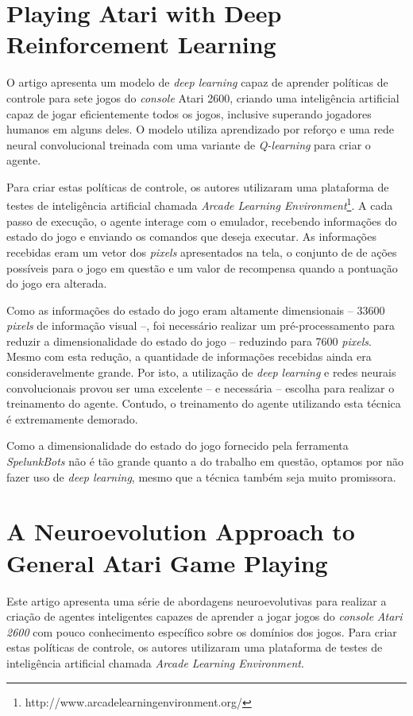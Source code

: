 \section{Playing Atari with Deep Reinforcement Learning}
O artigo apresenta um modelo de \textit{deep learning} capaz de aprender
políticas de controle para sete jogos do \textit{console} Atari 2600, criando
uma inteligência artificial capaz de jogar eficientemente todos os jogos,
inclusive superando jogadores humanos em alguns
deles\cite{DBLP:journals/corr/MnihKSGAWR13}. O modelo utiliza aprendizado por
reforço e uma rede neural convolucional treinada com uma variante de
\textit{Q-learning} para criar o agente.

Para criar estas políticas de controle, os autores utilizaram uma plataforma de
testes de inteligência artificial chamada \textit{Arcade Learning
Environment}\footnote{http://www.arcadelearningenvironment.org/}.  A cada passo
de execução, o agente interage com o emulador, recebendo informações do estado
do jogo e enviando os comandos que deseja executar. As informações recebidas
eram um vetor dos \textit{pixels} apresentados na tela, o conjunto de de ações
possíveis para o jogo em questão e um valor de recompensa quando a pontuação do
jogo era alterada.

Como as informações do estado do jogo eram altamente dimensionais -- 33600
\textit{pixels} de informação visual --, foi necessário realizar um
pré-processamento para reduzir a dimensionalidade do estado do jogo -- reduzindo
para 7600 \textit{pixels}. Mesmo com esta redução, a quantidade de informações
recebidas ainda era consideravelmente grande. Por isto, a utilização de
\textit{deep learning} e redes neurais convolucionais provou ser uma excelente
-- e necessária -- escolha para realizar o treinamento do agente. Contudo, o
treinamento do agente utilizando esta técnica é extremamente demorado.

Como a dimensionalidade do estado do jogo fornecido pela ferramenta
\textit{SpelunkBots} não é tão grande quanto a do trabalho em questão, optamos
por não fazer uso de \textit{deep learning}, mesmo que a técnica também seja
muito promissora.


\section{A Neuroevolution Approach to General Atari Game Playing}
Este artigo \cite{NeuroEvolutionAtari} apresenta uma série de abordagens
neuroevolutivas para realizar a criação de agentes inteligentes capazes de
aprender a jogar jogos do \textit{console} \textit{Atari 2600} com pouco
conhecimento específico sobre os domínios dos jogos. Para criar estas políticas
de controle, os autores utilizaram uma plataforma de testes de inteligência
artificial chamada \textit{Arcade Learning Environment}.

